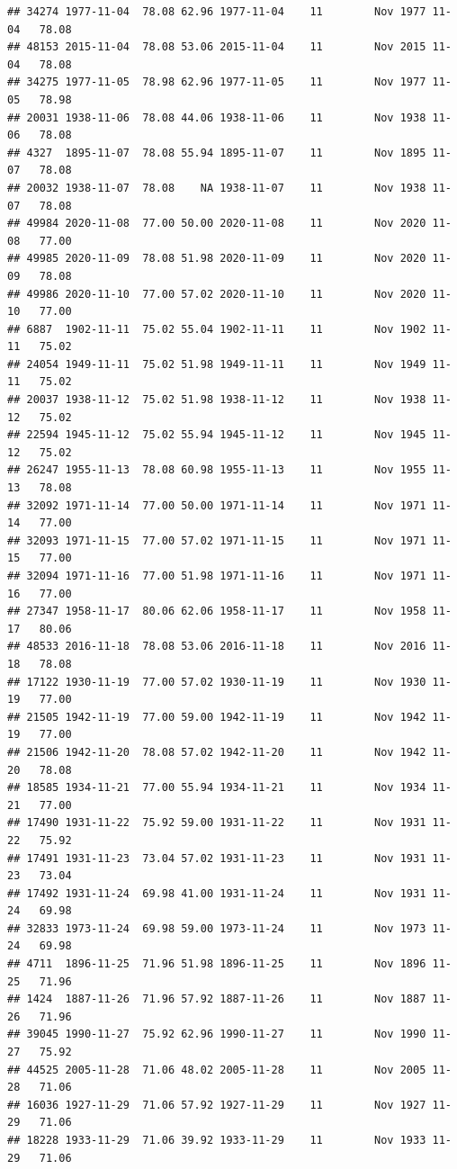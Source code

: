 \documentclass{article}\usepackage[]{graphicx}\usepackage[]{color}
\makeatletter
\newenvironment{kframe}{%
 \def\at@end@of@kframe{}%
 \ifinner\ifhmode%
  \def\at@end@of@kframe{\end{minipage}}%
  \begin{minipage}{\columnwidth}%
 \fi\fi%
 \def\FrameCommand##1{\hskip\@totalleftmargin \hskip-\fboxsep
 \colorbox{shadecolor}{##1}\hskip-\fboxsep
     \hskip-\linewidth \hskip-\@totalleftmargin \hskip\columnwidth}%
 \MakeFramed {\advance\hsize-\width
   \@totalleftmargin\z@ \linewidth\hsize
   \@setminipage}}%
 {\par\unskip\endMakeFramed%
 \at@end@of@kframe}
\newenvironment{knitrout}{}{} %
\makeatother
\begin{document}
\begin{knitrout}
\begin{kframe}
\begin{verbatim}
## 34274 1977-11-04  78.08 62.96 1977-11-04    11        Nov 1977 11-04   78.08
## 48153 2015-11-04  78.08 53.06 2015-11-04    11        Nov 2015 11-04   78.08
## 34275 1977-11-05  78.98 62.96 1977-11-05    11        Nov 1977 11-05   78.98
## 20031 1938-11-06  78.08 44.06 1938-11-06    11        Nov 1938 11-06   78.08
## 4327  1895-11-07  78.08 55.94 1895-11-07    11        Nov 1895 11-07   78.08
## 20032 1938-11-07  78.08    NA 1938-11-07    11        Nov 1938 11-07   78.08
## 49984 2020-11-08  77.00 50.00 2020-11-08    11        Nov 2020 11-08   77.00
## 49985 2020-11-09  78.08 51.98 2020-11-09    11        Nov 2020 11-09   78.08
## 49986 2020-11-10  77.00 57.02 2020-11-10    11        Nov 2020 11-10   77.00
## 6887  1902-11-11  75.02 55.04 1902-11-11    11        Nov 1902 11-11   75.02
## 24054 1949-11-11  75.02 51.98 1949-11-11    11        Nov 1949 11-11   75.02
## 20037 1938-11-12  75.02 51.98 1938-11-12    11        Nov 1938 11-12   75.02
## 22594 1945-11-12  75.02 55.94 1945-11-12    11        Nov 1945 11-12   75.02
## 26247 1955-11-13  78.08 60.98 1955-11-13    11        Nov 1955 11-13   78.08
## 32092 1971-11-14  77.00 50.00 1971-11-14    11        Nov 1971 11-14   77.00
## 32093 1971-11-15  77.00 57.02 1971-11-15    11        Nov 1971 11-15   77.00
## 32094 1971-11-16  77.00 51.98 1971-11-16    11        Nov 1971 11-16   77.00
## 27347 1958-11-17  80.06 62.06 1958-11-17    11        Nov 1958 11-17   80.06
## 48533 2016-11-18  78.08 53.06 2016-11-18    11        Nov 2016 11-18   78.08
## 17122 1930-11-19  77.00 57.02 1930-11-19    11        Nov 1930 11-19   77.00
## 21505 1942-11-19  77.00 59.00 1942-11-19    11        Nov 1942 11-19   77.00
## 21506 1942-11-20  78.08 57.02 1942-11-20    11        Nov 1942 11-20   78.08
## 18585 1934-11-21  77.00 55.94 1934-11-21    11        Nov 1934 11-21   77.00
## 17490 1931-11-22  75.92 59.00 1931-11-22    11        Nov 1931 11-22   75.92
## 17491 1931-11-23  73.04 57.02 1931-11-23    11        Nov 1931 11-23   73.04
## 17492 1931-11-24  69.98 41.00 1931-11-24    11        Nov 1931 11-24   69.98
## 32833 1973-11-24  69.98 59.00 1973-11-24    11        Nov 1973 11-24   69.98
## 4711  1896-11-25  71.96 51.98 1896-11-25    11        Nov 1896 11-25   71.96
## 1424  1887-11-26  71.96 57.92 1887-11-26    11        Nov 1887 11-26   71.96
## 39045 1990-11-27  75.92 62.96 1990-11-27    11        Nov 1990 11-27   75.92
## 44525 2005-11-28  71.06 48.02 2005-11-28    11        Nov 2005 11-28   71.06
## 16036 1927-11-29  71.06 57.92 1927-11-29    11        Nov 1927 11-29   71.06
## 18228 1933-11-29  71.06 39.92 1933-11-29    11        Nov 1933 11-29   71.06

\end{verbatim}
\end{kframe}
\end{knitrout}
\end{document}
